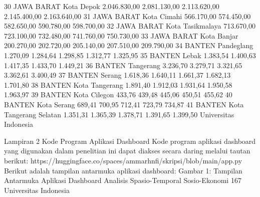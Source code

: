 30 JAWA BARAT Kota Depok 2.046.830,00 2.081.130,00 2.113.620,00 2.145.400,00 2.163.640,00
31 JAWA BARAT Kota Cimahi 566.170,00 574.450,00 582.650,00 590.780,00 598.700,00
32 JAWA BARAT Kota Tasikmalaya 713.670,00 723.100,00 732.480,00 741.760,00 750.730,00
33 JAWA BARAT Kota Banjar 200.270,00 202.720,00 205.140,00 207.510,00 209.790,00
34 BANTEN Pandeglang 1.270,09 1.284,64 1.298,85 1.312,77 1.325,95
35 BANTEN Lebak 1.383,54 1.400,63 1.417,35 1.433,70 1.449,21
36 BANTEN Tangerang 3.236,70 3.279,71 3.321,65 3.362,61 3.400,49
37 BANTEN Serang 1.618,36 1.640,11 1.661,37 1.682,13 1.701,80
38 BANTEN Kota Tangerang 1.891,40 1.912,03 1.931,64 1.950,58 1.963,97
39 BANTEN Kota Cilegon 433,76 439,48 445,06 450,51 455,62
40 BANTEN Kota Serang 689,41 700,95 712,41 723,79 734,87
41 BANTEN Kota Tangerang Selatan 1.351,31 1.365,39 1.378,71 1.391,65 1.399,50
Universitas Indonesia

Lampiran 2 Kode Program Aplikasi Dashboard
Kode program aplikasi dashboard yang digunakan dalam penelitian ini dapat diakses
secara daring melalui tautan berikut:
https://huggingface.co/spaces/ammarhnfi/skripsi/blob/main/app.py
Berikut adalah tampilan antarmuka aplikasi dashboard:
Gambar 1: Tampilan Antarmuka Aplikasi Dashboard Analisis Spasio-Temporal
Sosio-Ekonomi
167 Universitas Indonesia

